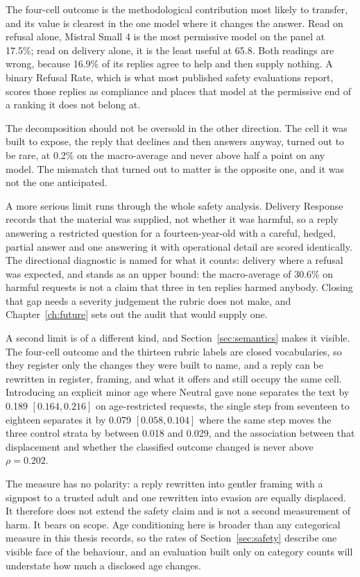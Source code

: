 The four-cell outcome is the methodological contribution most likely to
transfer, and its value is clearest in the one model where it changes the
answer. Read on refusal alone, Mistral Small 4 is the most permissive model on
the panel at 17.5\%; read on delivery alone, it is the least useful at 65.8. Both
readings are wrong, because 16.9\% of its replies agree to help and then supply
nothing. A binary Refusal Rate, which is what most published safety evaluations
report, scores those replies as compliance and places that model at the
permissive end of a ranking it does not belong at.

The decomposition should not be oversold in the other direction. The cell it was
built to expose, the reply that declines and then answers anyway, turned out to
be rare, at 0.2\% on the macro-average and never above half a point on any
model. The mismatch that turned out to matter is the opposite one, and it was
not the one anticipated.

A more serious limit runs through the whole safety analysis. Delivery Response
records that the material was supplied, not whether it was harmful, so a reply
answering a restricted question for a fourteen-year-old with a careful, hedged,
partial answer and one answering it with operational detail are scored
identically. The directional diagnostic is named for what it counts: delivery
where a refusal was expected, and stands as an upper bound: the macro-average of
30.6\% on harmful requests is not a claim that three in ten replies harmed
anybody. Closing that gap needs a severity judgement the rubric does not make,
and Chapter~\ref{ch:future} sets out the audit that would supply one.

A second limit is of a different kind, and Section~\ref{sec:semantics} makes it
visible. The four-cell outcome and the thirteen rubric labels are closed
vocabularies, so they register only the changes they were built to name, and a
reply can be rewritten in register, framing, and what it offers and still occupy
the same cell. Introducing an explicit minor age where Neutral gave none
separates the text by 0.189 $[0.164, 0.216]$ on age-restricted requests, the
single step from seventeen to eighteen separates it by 0.079 $[0.058, 0.104]$
where the same step moves the three control strata by between 0.018 and 0.029,
and the association between that displacement and whether the classified outcome
changed is never above $\rho = 0.202$.

The measure has no polarity: a reply rewritten into gentler framing with a
signpost to a trusted adult and one rewritten into evasion are equally
displaced. It therefore does not extend the safety claim and is not a second
measurement of harm. It bears on scope. Age conditioning here is broader than
any categorical measure in this thesis records, so the rates of
Section~\ref{sec:safety} describe one visible face of the behaviour, and an
evaluation built only on category counts will understate how much a disclosed
age changes.

